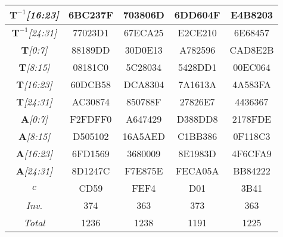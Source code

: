 \begin{sidewaystable}
\begin{center}
\begin{tabular}{|c||c|c|c|c|}
\emph{$\mathbf{T}^{-1}$[16:23]} &  6BC237F &  703806D &  6DD604F &  E4B8203  \\ \hline
\emph{$\mathbf{T}^{-1}$[24:31]} &  77023D1 &  67ECA25 &  E2CE210 &  6E68457  \\ \hline
\emph{$\mathbf{T}$[0:7]} &  88189DD &  30D0E13 &  A782596 &  CAD8E2B  \\ \hline
\emph{$\mathbf{T}$[8:15]} &  08181C0 &  5C28034 &  5428DD1 &  00EC064  \\ \hline
\emph{$\mathbf{T}$[16:23]} &  60DCB58 &  DCA8304 &  7A1613A &  4A583FA  \\ \hline
\emph{$\mathbf{T}$[24:31]} &  AC30874 &  850788F &  27826E7 &  4436367  \\ \hline
\emph{$\mathbf{A}$[0:7]} &  F2FDFF0 &  A647429 &  D388DD8 &  2178FDE  \\ \hline
\emph{$\mathbf{A}$[8:15]} &  D505102 &  16A5AED &  C1BB386 &  0F118C3  \\ \hline
\emph{$\mathbf{A}$[16:23]} &  6FD1569 &  3680009 &  8E1983D &  4F6CFA9  \\ \hline
\emph{$\mathbf{A}$[24:31]} &  8D1247C &  F7E875E &  FECA05A &  BB84222  \\ \hline
\emph{$c$} &  CD59 &  FEF4 &  D01 &  3B41  \\ \hline
\emph{Inv.} &  374 &  363 &  373 &  363  \\ \hline
\emph{Total} &   1236 &   1238 &   1191 &   1225  \\ \hline
    \end{tabular}
\end{center}
\end{sidewaystable}

